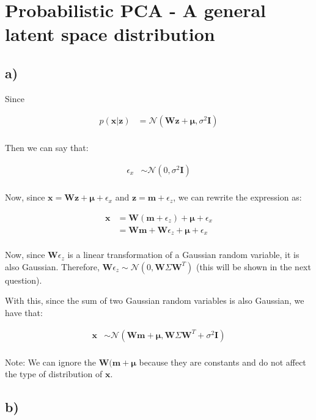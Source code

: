 \documentclass[12pt,a4paper,oneside]{paper}
\begin{document}
\newpage
\section{Probabilistic PCA - A general latent space distribution}

\subsection*{a)}

Since 

\begin{align*}
    p(\bm{x} | \bm{z}) &= \mathcal{N}(\bm{W}\bm{z} + \bm{\mu}, \sigma^2 \bm{I}) \\
\end{align*}

Then we can say that:

\begin{align*}
    \epsilon_x &\sim \mathcal{N}(0, \sigma^2 \bm{I}) \\
\end{align*}

Now, since \( \bm{x} = \bm{W}\bm{z} + \bm{\mu} + \epsilon_x \) and $\bm{z} = \bm{m} + \epsilon_z$, we can rewrite the expression as:

\begin{align*}
    \bm{x} &= \bm{W}(\bm{m} + \epsilon_z) + \bm{\mu} + \epsilon_x \\
    &= \bm{W}\bm{m} + \bm{W}\epsilon_z + \bm{\mu} + \epsilon_x \\
\end{align*}

Now, since \( \bm{W}\epsilon_z \) is a linear transformation of a Gaussian random variable, it is also Gaussian.
Therefore, \( \bm{W}\epsilon_z \sim \mathcal{N}(0, \bm{W} \Sigma \bm{W}^T) \) (this will be shown in the next question).

With this, since the sum of two Gaussian random variables is also Gaussian, we have that:

\begin{align*}
    \bm{x} &\sim \mathcal{N}(\bm{W}\bm{m} + \bm{\mu}, \bm{W} \Sigma \bm{W}^T + \sigma^2 \bm{I}) \\
\end{align*}

Note: We can ignore the $\bm{W}(\bm{m} + \bm{\mu}$ because they are constants and do not affect the type of distribution of $\bm{x}$.

\subsection*{b)}
\end{document}
